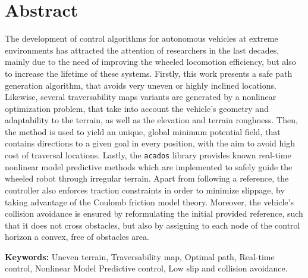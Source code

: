 
\section*{Abstract}


\noindent The development of control algorithms for autonomous vehicles at extreme environments has attracted the attention of researchers in the last decades, mainly due to the need of improving the wheeled locomotion efficiency, but also to increase the lifetime of these systems. Firstly, this work presents a safe path generation algorithm, that avoids very uneven or highly inclined locations. Likewise, several traversability maps variants are generated by a nonlinear optimization problem, that take into account the vehicle's geometry and adaptability to the terrain, as well as the elevation and terrain roughness. Then, the  method is used to yield an unique, global minimum potential field, that contains directions to a given goal in every position, with the aim to avoid high cost of traversal locations. Lastly, the \texttt{acados} library provides known real-time nonlinear model predictive methods which are implemented to safely guide the wheeled robot through irregular terrain. Apart from following a reference, the controller also enforces traction constraints in order to minimize slippage, by taking advantage of the Coulomb friction model theory. Moreover, the vehicle's collision avoidance is ensured by reformulating the initial provided reference, such that it does not cross obstacles, but also by assigning to each node of the control horizon a convex, free of obstacles area.

\vfill

\textbf{\Large Keywords:} Uneven terrain, Traversability map, Optimal path, Real-time control, Nonlinear Model Predictive control, Low slip and collision avoidance.

